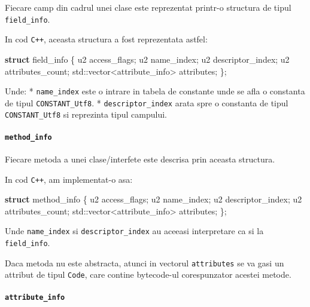 \documentclass[]{article}
\newenvironment{Shaded}{}{}
\newcommand{\KeywordTok}[1]{\textcolor[rgb]{0.00,0.44,0.13}{\textbf{#1}}}
\newcommand{\BuiltInTok}[1]{#1}
\newcommand{\NormalTok}[1]{#1}
\let\oldparagraph\paragraph
\renewcommand{\paragraph}[1]{\oldparagraph{#1}\mbox{}}
\begin{document}
Fiecare camp din cadrul unei clase este reprezentat printr-o structura
de tipul \texttt{field\_info}.

In cod \texttt{C++}, aceasta structura a fost reprezentata astfel:

\begin{Shaded}
\begin{Highlighting}[]
\KeywordTok{struct}\NormalTok{ field_info \{}
\NormalTok{    u2 access_flags;}
\NormalTok{    u2 name_index;}
\NormalTok{    u2 descriptor_index;}
\NormalTok{    u2 attributes_count;}
    \BuiltInTok{std::}\NormalTok{vector<attribute_info> attributes;}
\NormalTok{\};}
\end{Highlighting}
\end{Shaded}

Unde: * \texttt{name\_index} este o intrare in tabela de constante unde
se afla o constanta de tipul \texttt{CONSTANT\_Utf8}. *
\texttt{descriptor\_index} arata spre o constanta de tipul
\texttt{CONSTANT\_Utf8} si reprezinta tipul campului.

\paragraph{\texorpdfstring{\texttt{method\_info}}{method\_info}}\label{method_info}

Fiecare metoda a unei clase/interfete este descrisa prin aceasta
structura.

In cod \texttt{C++}, am implementat-o asa:

\begin{Shaded}
\begin{Highlighting}[]
\KeywordTok{struct}\NormalTok{ method_info \{}
\NormalTok{    u2 access_flags;}
\NormalTok{    u2 name_index;}
\NormalTok{    u2 descriptor_index;}
\NormalTok{    u2 attributes_count;}
    \BuiltInTok{std::}\NormalTok{vector<attribute_info> attributes;}
\NormalTok{\};}
\end{Highlighting}
\end{Shaded}

Unde \texttt{name\_index} si \texttt{descriptor\_index} au aceeasi
interpretare ca si la \texttt{field\_info}.

Daca metoda nu este abstracta, atunci in vectorul \texttt{attributes} se
va gasi un attribut de tipul \texttt{Code}, care contine bytecode-ul
corespunzator acestei metode.

\paragraph{\texorpdfstring{\texttt{attribute\_info}}{attribute\_info}}\label{attribute_info}
\end{document}
